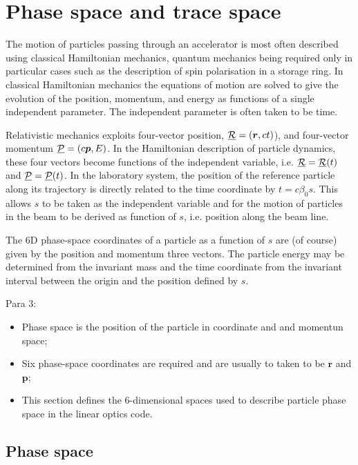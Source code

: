 \graphicspath{ {03-PhaseTraceSpace/Figures/} }

\section{Phase space and trace space}

The motion of particles passing through an accelerator is most often
described using classical Hamiltonian mechanics, quantum mechanics
being required only in particular cases such as the description of
spin polarisation in a storage ring.
In classical Hamiltonian mechanics the equations of motion are solved
to give the evolution of the position, momentum, and energy as
functions of a single independent parameter.
The independent parameter is often taken to be time.

Relativistic mechanics exploits four-vector position,
$\underline{\cal{R}} = (\bm{r}, ct)$), and four-vector momentum  
$\underline{\cal{P}} = (c\bm{p}, E)$.
In the Hamiltonian description of particle dynamics, these four
vectors become functions of the independent variable, i.e.
$\underline{\cal{R}} = \underline{\cal{R}}(t)$ and
$\underline{\cal{P}} = \underline{\cal{P}}(t)$.
In the laboratory system, the position of the reference particle along
its trajectory is directly related to the time coordinate by
$t = c \beta_0 s$.
This allows $s$ to be taken as the independent variable and for the
motion of particles in the beam to be derived as function of $s$,
i.e. position along the beam line.

The 6D phase-space coordinates of a particle as a function of $s$ are
(of course) given by the position and momentum three vectors.
The particle energy may be determined from the invariant mass and the
time coordinate from the invariant interval between the origin and the
position defined by $s$.

Para 3:
\begin{itemize}
  \item Phase space is the position of the particle in coordinate and
    and momentun space;
  \item Six phase-space coordinates are required and are usually to
    taken to be $\bm{r}$ and $\bm{p}$;
  \item This section defines the 6-dimensional spaces used to describe
    particle phase space in the linear optics code.
\end{itemize}

\subsection{Phase space}

